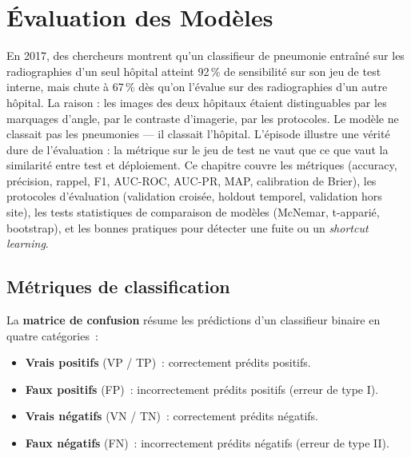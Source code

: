 \chapter{\'Evaluation des Mod\`eles}
\label{ch:evaluation}

En 2017, des chercheurs montrent qu'un classifieur de pneumonie entraîné sur les radiographies d'un seul hôpital atteint 92\,\% de sensibilité sur son jeu de test interne, mais chute à 67\,\% dès qu'on l'évalue sur des radiographies d'un autre hôpital. La raison : les images des deux hôpitaux étaient distinguables par les marquages d'angle, par le contraste d'imagerie, par les protocoles. Le modèle ne classait pas les pneumonies --- il classait l'hôpital. L'épisode illustre une vérité dure de l'évaluation : la métrique sur le jeu de test ne vaut que ce que vaut la similarité entre test et déploiement. Ce chapitre couvre les métriques (accuracy, précision, rappel, F1, AUC-ROC, AUC-PR, MAP, calibration de Brier), les protocoles d'évaluation (validation croisée, holdout temporel, validation hors site), les tests statistiques de comparaison de modèles (McNemar, t-apparié, bootstrap), et les bonnes pratiques pour détecter une fuite ou un \emph{shortcut learning}.

\section{M\'etriques de classification}
\label{sec:metriques_classif}


\begin{definition}
La \textbf{matrice de confusion} r\'esume les pr\'edictions d'un classifieur binaire en quatre cat\'egories~:
\begin{itemize}
    \item \textbf{Vrais positifs} (VP / TP)~: correctement pr\'edits positifs.
    \item \textbf{Faux positifs} (FP)~: incorrectement pr\'edits positifs (erreur de type I).
    \item \textbf{Vrais n\'egatifs} (VN / TN)~: correctement pr\'edits n\'egatifs.
    \item \textbf{Faux n\'egatifs} (FN)~: incorrectement pr\'edits n\'egatifs (erreur de type II).
\end{itemize}
\end{definition}

